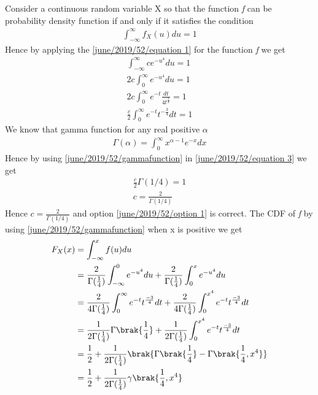 Consider a continuous random variable X so that the function \textit{f} can be probability density function if and only if it satisfies the condition 
\begin{align}
    \int_{-\infty}^{\infty}f_{X}(u)du = 1 \label{june/2019/52/equation 1}
\end{align}
Hence by applying the \eqref{june/2019/52/equation 1} for the function \textit{f} we get
\begin{align}
    \int_{-\infty}^{\infty}ce^{-u^{4}}du = 1\\
    2c\int_{0}^{\infty}e^{-u^{4}}du = 1\label{june/2019/52/equation 2}\\
    2c\int_{0}^{\infty}e^{-t}\frac{dt}{4t^{\frac{3}{4}}} = 1\\
    \frac{c}{2}\int_{0}^{\infty}e^{-t}t^{-\frac{3}{4}}dt = 1\label{june/2019/52/equation 3}
\end{align}
We know that gamma function for any real positive $\alpha$
\begin{align}
    \Gamma(\alpha) = \int_0^\infty x^{\alpha - 1} e^{-x} dx \label{june/2019/52/gammafunction}
\end{align}
Hence by using \eqref{june/2019/52/gammafunction} in \eqref{june/2019/52/equation 3} we get
\begin{align}
    \frac{c}{2}\Gamma(1/4) = 1\\
    c=\frac{2}{\Gamma(1/4)}
\end{align}
Hence $c = \displaystyle\frac{2}{\Gamma(1/4)}$ and option \eqref{june/2019/52/option 1} is correct.\newline\newline
The CDF of \textit{f} by using \eqref{june/2019/52/gammafunction} when x is positive we get
\begin{align}
    F_{X}(x) &= \int_{-\infty}^{x}f(u)du\\
             &= \frac{2}{\Gamma(\frac{1}{4})}\int_{-\infty}^{0}e^{-u^{4}}du+\frac{2}{\Gamma(\frac{1}{4})}\int_{0}^{x}e^{-u^{4}}du\\
             &= \frac{2}{4\Gamma(\frac{1}{4})}\int_{0}^{\infty}e^{-t}{t^{\frac{-3}{4}}}dt+\frac{2}{4\Gamma(\frac{1}{4})}\int_{0}^{x^{4}}e^{-t}{t^{\frac{-3}{4}}}dt\\
             &=\frac{1}{2\Gamma(\frac{1}{4})}\Gamma\brak{\frac{1}{4}}+ \frac{1}{2\Gamma(\frac{1}{4})}\int_{0}^{x^{4}}e^{-t}{t^{\frac{-3}{4}}}dt\\
             &=\frac{1}{2}+ \frac{1}{2\Gamma(\frac{1}{4})}\brak{\Gamma\brak{\frac{1}{4}}-\Gamma\brak{\frac{1}{4},x^{4}}}\\
             &=\frac{1}{2}+ \frac{1}{2\Gamma(\frac{1}{4})}\gamma\brak{\frac{1}{4},x^{4}}
\end{align}
